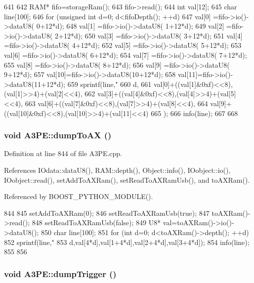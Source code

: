 \begin{DoxyCode}
641                       {
642   RAM* fifo=storageRam();
643   fifo->read();
644   int val[12];
645   char line[100];
646   for (unsigned int d=0; d<fifoDepth(); ++d){
647     val[0] =fifo->io()->dataU8( 0+12*d);
648     val[1] =fifo->io()->dataU8( 1+12*d);
649     val[2] =fifo->io()->dataU8( 2+12*d);
650     val[3] =fifo->io()->dataU8( 3+12*d);
651     val[4] =fifo->io()->dataU8( 4+12*d);
652     val[5] =fifo->io()->dataU8( 5+12*d);
653     val[6] =fifo->io()->dataU8( 6+12*d);
654     val[7] =fifo->io()->dataU8( 7+12*d);
655     val[8] =fifo->io()->dataU8( 8+12*d);
656     val[9] =fifo->io()->dataU8( 9+12*d);
657     val[10]=fifo->io()->dataU8(10+12*d);
658     val[11]=fifo->io()->dataU8(11+12*d);
659     sprintf(line,"%
660         d,
661         val[0]+((val[1]&0xf)<<8),(val[1]>>4)+(val[2]<<4),
662         val[3]+((val[4]&0xf)<<8),(val[4]>>4)+(val[5]<<4),
663         val[6]+((val[7]&0xf)<<8),(val[7]>>4)+(val[8]<<4),
664         val[9]+((val[10]&0xf)<<8),(val[10]>>4)+(val[11]<<4)
665         );
666     info(line);
667   }
668 }
\end{DoxyCode}
\hypertarget{classA3PE_ad6b6f1ae4ac23e6d0827eee8cc2c98e4}{
\subsubsection[{dumpToAX}]{\setlength{\rightskip}{0pt plus 5cm}void A3PE::dumpToAX ()}}
\label{classA3PE_ad6b6f1ae4ac23e6d0827eee8cc2c98e4}


Definition at line 844 of file A3PE.cpp.

References IOdata::dataU8(), RAM::depth(), Object::info(), IOobject::io(), IOobject::read(), setAddToAXRam(), setReadToAXRamUsb(), and toAXRam().

Referenced by BOOST\_\-PYTHON\_\-MODULE().


\begin{DoxyCode}
844                    {
845   setAddToAXRam(0);
846   setReadToAXRamUsb(true);
847   toAXRam()->read();
848   setReadToAXRamUsb(false);
849   U8* val=toAXRam()->io()->dataU8();
850   char line[100];
851   for (int d=0; d<toAXRam()->depth(); ++d){
852     sprintf(line,"%
853         d,val[4*d],val[1+4*d],val[2+4*d],val[3+4*d]);
854     info(line);
855   }
856 }
\end{DoxyCode}
\hypertarget{classA3PE_aeab7701d0d1f6fd910e952b631769d42}{
\subsubsection[{dumpTrigger}]{\setlength{\rightskip}{0pt plus 5cm}void A3PE::dumpTrigger ()}}
\label{classA3PE_aeab7701d0d1f6fd910e952b631769d42}


